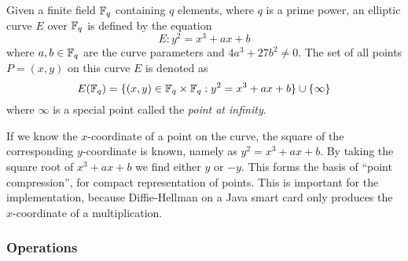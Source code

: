 \begin{definition}\label{def:elliptic_curve}
  Given a finite field $\mathbb{F}_{q}$ containing $q$ elements, where $q$ is a prime
  power, an elliptic curve $E$ over $\mathbb{F}_{q}$ is defined by the equation
  \begin{equation}\label{eqn:elliptic_curve}
    E: y^2 = x^3 + a x + b
  \end{equation}
  where $a, b \in \mathbb{F}_{q}$ are the curve parameters and $4 a^3 + 27 b^2 \neq 0$.
  The set of all points $P = (x, y)$ on this curve $E$ is denoted as
  \begin{equation*}
    E(\mathbb{F}_{q}) = \{ (x, y) \in \mathbb{F}_{q} \times \mathbb{F}_{q} : y^2 = x^3 + a x + b \}
                         \cup \{ \infty \}
  \end{equation*}
  where $\infty$ is a special point called the \emph{point at infinity}.
\end{definition}

If we know the $x$-coordinate of a point on the curve, the square of the
corresponding $y$-coordinate is known, namely as $y^{2} = x^{3} + ax + b$.
By taking the square root of $x^{3} + ax + b$ we find either $y$ or $-y$.
This forms the basis of ``point compression'', for compact representation
of points.  This is important for the implementation, because Diffie-Hellman
on a Java smart card only produces the $x$-coordinate of a multiplication.

\subsubsection{Operations}


